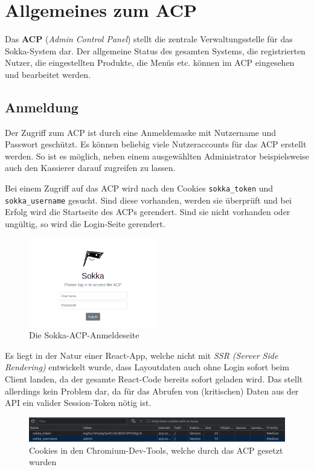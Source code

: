 \chapter{Allgemeines zum ACP}

Das \textbf{ACP} (\textit{Admin Control Panel}) stellt die zentrale Verwaltungsstelle für das Sokka-System dar. Der allgemeine Status des gesamten Systems, die registrierten Nutzer, die eingestellten Produkte, die Menüs etc. können im ACP eingesehen und bearbeitet werden.

\section{Anmeldung}
\label{acp-anmeldung}

Der Zugriff zum ACP ist durch eine Anmeldemaske mit Nutzername und Passwort geschützt. Es können beliebig viele Nutzeraccounts für das ACP erstellt werden. So ist es möglich, neben einem ausgewählten Administrator beispielsweise auch den Kassierer darauf zugreifen zu lassen.

Bei einem Zugriff auf das ACP wird nach den Cookies \lstinline{sokka_token} und \lstinline{sokka_username} gesucht. Sind diese vorhanden, werden sie überprüft und bei Erfolg wird die Startseite des ACPs gerendert. Sind sie nicht vorhanden oder ungültig, so wird die Login-Seite gerendert.

\begin{figure}[ht]
    \centering
    \includegraphics[width=0.5\textwidth]{images/ACP/login.png}
    \caption{Die Sokka-ACP-Anmeldeseite}
\end{figure}

Es liegt in der Natur einer React-App, welche nicht mit \textit{SSR (Server Side Rendering)} entwickelt wurde, dass Layoutdaten auch ohne Login sofort beim Client landen, da der gesamte React-Code bereits sofort geladen wird. Das stellt allerdings kein Problem dar, da für das Abrufen von (kritischen) Daten aus der API ein valider Session-Token nötig ist.

\begin{figure}[ht]
    \centering
    \includegraphics[width=1\textwidth]{images/ACP/cookies.png}
    \caption{Cookies in den Chromium-Dev-Tools, welche durch das ACP gesetzt wurden}
\end{figure}

